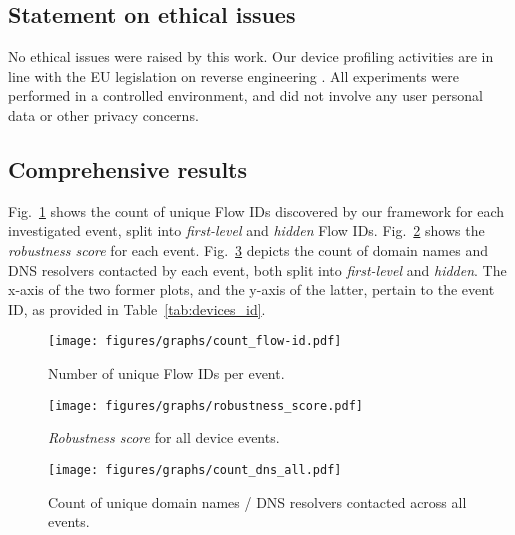 \subsection{Statement on ethical issues}
No ethical issues were raised by this work.
Our device profiling activities are in line with the EU legislation on reverse engineering
\cite{eu-law-reverse,eu-law-interpretation}.
All experiments were performed in a controlled environment,
and did not involve any user personal data or other privacy concerns.

\subsection{Comprehensive results}
\label{app:full_results}

Fig.~\ref{fig:count_flow_id} shows the count of unique Flow IDs discovered by our framework
for each investigated event,
split into \emph{first-level} and \emph{hidden} Flow IDs.
Fig.~\ref{fig:robustness-score} shows the \emph{robustness score}
for each event.
Fig.~\ref{fig:count_dns_all} depicts the count of
domain names and DNS resolvers contacted by each event,
both split into \emph{first-level} and \emph{hidden}.
The x-axis of the two former plots,
and the y-axis of the latter,
pertain to the event ID,
as provided in Table~\ref{tab:devices_id}.

\begin{figure}
  \centering
  \texttt{[image: figures/graphs/count\_flow-id.pdf]}
  \caption{Number of unique Flow IDs per event.}
  \label{fig:count_flow_id}
\end{figure}

\begin{figure}
  \centering
  \texttt{[image: figures/graphs/robustness\_score.pdf]}
  \caption{\emph{Robustness score} for all device events.}
  \label{fig:robustness-score}
\end{figure}

\begin{figure}
  \centering
  \texttt{[image: figures/graphs/count\_dns\_all.pdf]}
  \caption{Count of unique domain names / DNS resolvers contacted across all events.}
  \label{fig:count_dns_all}
\end{figure}
